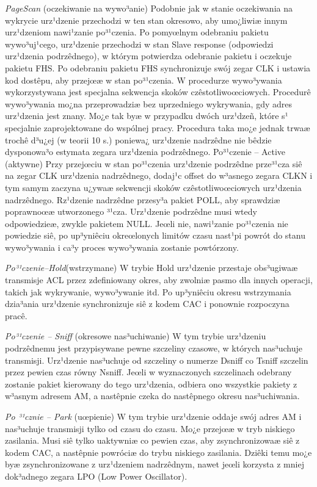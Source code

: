 \emph{PageScan} (oczekiwanie na wywo³anie) Podobnie jak w stanie
oczekiwania na wykrycie urz¹dzenie przechodzi w ten stan okresowo,
aby umo¿liwiæ innym urz¹dzeniom nawi¹zanie po³¹czenia. Po pomyœlnym
odebraniu pakietu wywo³uj¹cego, urz¹dzenie przechodzi w stan Slave
response (odpowiedzi urz¹dzenia podrzêdnego), w którym potwierdza
odebranie pakietu i oczekuje pakietu FHS. Po odebraniu pakietu FHS
synchronizuje swój zegar CLK i ustawia kod dostêpu, aby przejœæ w
stan po³¹czenia. W procedurze wywo³ywania wykorzystywana jest
specjalna sekwencja skoków czêstotliwoœciowych. Procedurê
wywo³ywania mo¿na przeprowadziæ bez uprzedniego wykrywania, gdy
adres urz¹dzenia jest znany. Mo¿e tak byæ w przypadku dwóch
urz¹dzeñ, które s¹ specjalnie zaprojektowane do wspólnej pracy.
Procedura taka mo¿e jednak trwaæ trochê d³u¿ej (w teorii 10 s.)
poniewa¿ urz¹dzenie nadrzêdne nie bêdzie dysponowa³o estymata zegara
urz¹dzenia podrzêdnego. Po³¹czenie – Active (aktywne) Przy przejœciu
w stan po³¹czenia urz¹dzenie podrzêdne prze³¹cza siê na zegar CLK
urz¹dzenia nadrzêdnego, dodaj¹c offset do w³asnego zegara CLKN i tym
samym zaczyna u¿ywaæ sekwencji skoków czêstotliwoœciowych urz¹dzenia
nadrzêdnego. Rz¹dzenie nadrzêdne przesy³a pakiet POLL, aby
sprawdziæ poprawnoœæ utworzonego ³¹cza. Urz¹dzenie podrzêdne musi
wtedy odpowiedzieæ, zwykle pakietem NULL. Jeœli nie, nawi¹zanie
po³¹czenia nie powiedzie siê, po up³yniêciu okreœlonych limitów
czasu nast¹pi powrót do stanu wywo³ywania i ca³y proces wywo³ywania
zostanie powtórzony.

\emph{Po³¹czenie–Hold}(wstrzymane) W trybie Hold urz¹dzenie
przestaje obs³ugiwaæ transmisje ACL przez zdefiniowany okres, aby
zwolniæ pasmo dla innych operacji, takich jak wykrywanie,
wywo³ywanie itd. Po up³yniêciu okresu wstrzymania dzia³ania
urz¹dzenie synchronizuje siê z kodem CAC i ponownie rozpoczyna
pracê.

\emph{Po³¹czenie – Sniff} (okresowe nas³uchiwanie) W tym trybie
urz¹dzeniu podrzêdnemu jest przypisywane pewne szczeliny czasowe, w
których nas³uchuje transmisji. Urz¹dzenie nas³uchuje od szczeliny o
numerze Dsniff co Tsniff szczelin przez pewien czas równy Nsniff.
Jeœli w wyznaczonych szczelinach odebrany zostanie pakiet kierowany
do tego urz¹dzenia, odbiera ono wszystkie pakiety z w³asnym adresem
AM, a nastêpnie czeka do nastêpnego okresu nas³uchiwania.

\emph{Po ³¹cznie – Park} (uœpienie) W tym trybie urz¹dzenie oddaje
swój adres AM i nas³uchuje transmisji tylko od czasu do czasu. Mo¿e
przejœæ w tryb niskiego zasilania. Musi siê tylko uaktywniæ co
pewien czas, aby zsynchronizowaæ siê z kodem CAC, a nastêpnie
powróciæ do trybu niskiego zasilania. Dziêki temu mo¿e byæ
zsynchronizowane z urz¹dzeniem nadrzêdnym, nawet jeœli korzysta z
mniej dok³adnego zegara LPO (Low Power Oscillator).
